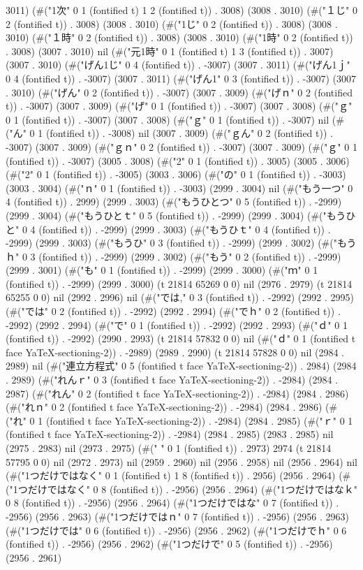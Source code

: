 3011) (#("1次" 0 1 (fontified t) 1 2 (fontified t)) . 3008) (3008 . 3010) (#("１じ" 0 2 (fontified t)) . 3008) (3008 . 3010) (#("1じ" 0 2 (fontified t)) . 3008) (3008 . 3010) (#("１時" 0 2 (fontified t)) . 3008) (3008 . 3010) (#("1時" 0 2 (fontified t)) . 3008) (3007 . 3010) nil (#("元1時" 0 1 (fontified t) 1 3 (fontified t)) . 3007) (3007 . 3010) (#("げん1じ" 0 4 (fontified t)) . -3007) (3007 . 3011) (#("げん1ｊ" 0 4 (fontified t)) . -3007) (3007 . 3011) (#("げん1" 0 3 (fontified t)) . -3007) (3007 . 3010) (#("げん" 0 2 (fontified t)) . -3007) (3007 . 3009) (#("げｎ" 0 2 (fontified t)) . -3007) (3007 . 3009) (#("げ" 0 1 (fontified t)) . -3007) (3007 . 3008) (#("ｇ" 0 1 (fontified t)) . -3007) (3007 . 3008) (#("ｇ" 0 1 (fontified t)) . -3007) nil (#("ん" 0 1 (fontified t)) . -3008) nil (3007 . 3009) (#("ｇん" 0 2 (fontified t)) . -3007) (3007 . 3009) (#("ｇｎ" 0 2 (fontified t)) . -3007) (3007 . 3009) (#("ｇ" 0 1 (fontified t)) . -3007) (3005 . 3008) (#("2" 0 1 (fontified t)) . 3005) (3005 . 3006) (#("2" 0 1 (fontified t)) . -3005) (3003 . 3006) (#("の" 0 1 (fontified t)) . -3003) (3003 . 3004) (#("ｎ" 0 1 (fontified t)) . -3003) (2999 . 3004) nil (#("もう一つ" 0 4 (fontified t)) . 2999) (2999 . 3003) (#("もうひとつ" 0 5 (fontified t)) . -2999) (2999 . 3004) (#("もうひとｔ" 0 5 (fontified t)) . -2999) (2999 . 3004) (#("もうひと" 0 4 (fontified t)) . -2999) (2999 . 3003) (#("もうひｔ" 0 4 (fontified t)) . -2999) (2999 . 3003) (#("もうひ" 0 3 (fontified t)) . -2999) (2999 . 3002) (#("もうｈ" 0 3 (fontified t)) . -2999) (2999 . 3002) (#("もう" 0 2 (fontified t)) . -2999) (2999 . 3001) (#("も" 0 1 (fontified t)) . -2999) (2999 . 3000) (#("ｍ" 0 1 (fontified t)) . -2999) (2999 . 3000) (t 21814 65269 0 0) nil (2976 . 2979) (t 21814 65255 0 0) nil (2992 . 2996) nil (#("では," 0 3 (fontified t)) . -2992) (2992 . 2995) (#("では" 0 2 (fontified t)) . -2992) (2992 . 2994) (#("でｈ" 0 2 (fontified t)) . -2992) (2992 . 2994) (#("で" 0 1 (fontified t)) . -2992) (2992 . 2993) (#("ｄ" 0 1 (fontified t)) . -2992) (2990 . 2993) (t 21814 57832 0 0) nil (#("ｄ" 0 1 (fontified t face YaTeX-sectioning-2)) . -2989) (2989 . 2990) (t 21814 57828 0 0) nil (2984 . 2989) nil (#("連立方程式" 0 5 (fontified t face YaTeX-sectioning-2)) . 2984) (2984 . 2989) (#("れんｒ" 0 3 (fontified t face YaTeX-sectioning-2)) . -2984) (2984 . 2987) (#("れん" 0 2 (fontified t face YaTeX-sectioning-2)) . -2984) (2984 . 2986) (#("れｎ" 0 2 (fontified t face YaTeX-sectioning-2)) . -2984) (2984 . 2986) (#("れ" 0 1 (fontified t face YaTeX-sectioning-2)) . -2984) (2984 . 2985) (#("ｒ" 0 1 (fontified t face YaTeX-sectioning-2)) . -2984) (2984 . 2985) (2983 . 2985) nil (2975 . 2983) nil (2973 . 2975) (#(" " 0 1 (fontified t)) . 2973) 2974 (t 21814 57795 0 0) nil (2972 . 2973) nil (2959 . 2960) nil (2956 . 2958) nil (2956 . 2964) nil (#("1つだけではなく" 0 1 (fontified t) 1 8 (fontified t)) . 2956) (2956 . 2964) (#("1つだけではなく" 0 8 (fontified t)) . -2956) (2956 . 2964) (#("1つだけではなｋ" 0 8 (fontified t)) . -2956) (2956 . 2964) (#("1つだけではな" 0 7 (fontified t)) . -2956) (2956 . 2963) (#("1つだけではｎ" 0 7 (fontified t)) . -2956) (2956 . 2963) (#("1つだけでは" 0 6 (fontified t)) . -2956) (2956 . 2962) (#("1つだけでｈ" 0 6 (fontified t)) . -2956) (2956 . 2962) (#("1つだけで" 0 5 (fontified t)) . -2956) (2956 . 2961) 